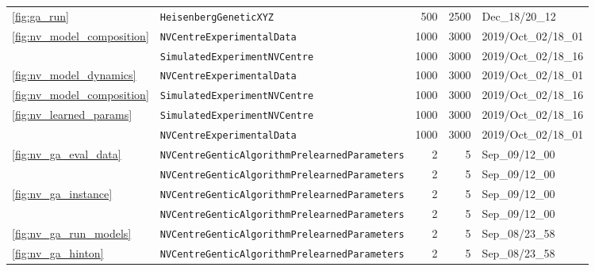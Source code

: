 \begin{tabular}{llrrl}
\cline{1-5}
\cref{fig:ga_run} & \texttt{HeisenbergGeneticXYZ} &                                      500 &                                     2500 &                           Dec\_18/20\_12 \\
\multirow{2}{*}{\cref{fig:nv_model_composition}} & \texttt{NVCentreExperimentalData} &                                     1000 &                                     3000 &                      2019/Oct\_02/18\_01 \\
                        & \texttt{SimulatedExperimentNVCentre} &                                     1000 &                                     3000 &                      2019/Oct\_02/18\_16 \\
\cline{1-5}
\cref{fig:nv_model_dynamics} & \texttt{NVCentreExperimentalData} &                                     1000 &                                     3000 &                      2019/Oct\_02/18\_01 \\
\cref{fig:nv_model_composition} & \texttt{SimulatedExperimentNVCentre} &                                     1000 &                                     3000 &                      2019/Oct\_02/18\_16 \\
\multirow{2}{*}{\cref{fig:nv_learned_params}} & \texttt{SimulatedExperimentNVCentre} &                                     1000 &                                     3000 &                      2019/Oct\_02/18\_16 \\
                        & \texttt{NVCentreExperimentalData} &                                     1000 &                                     3000 &                      2019/Oct\_02/18\_01 \\
\cline{1-5}
\multirow{2}{*}{\cref{fig:nv_ga_eval_data}} & \texttt{NVCentreGenticAlgorithmPrelearnedParameters} &                                        2 &                                        5 &                           Sep\_09/12\_00 \\
                        & \texttt{NVCentreGenticAlgorithmPrelearnedParameters} &                                        2 &                                        5 &                           Sep\_09/12\_00 \\
\cline{1-5}
\multirow{2}{*}{\cref{fig:nv_ga_instance}} & \texttt{NVCentreGenticAlgorithmPrelearnedParameters} &                                        2 &                                        5 &                           Sep\_09/12\_00 \\
                        & \texttt{NVCentreGenticAlgorithmPrelearnedParameters} &                                        2 &                                        5 &                           Sep\_09/12\_00 \\
\cline{1-5}
\cref{fig:nv_ga_run_models} & \texttt{NVCentreGenticAlgorithmPrelearnedParameters} &                                        2 &                                        5 &                           Sep\_08/23\_58 \\
\cref{fig:nv_ga_hinton} & \texttt{NVCentreGenticAlgorithmPrelearnedParameters} &                                        2 &                                        5 &                           Sep\_08/23\_58 \\
\hline
\end{tabular}
